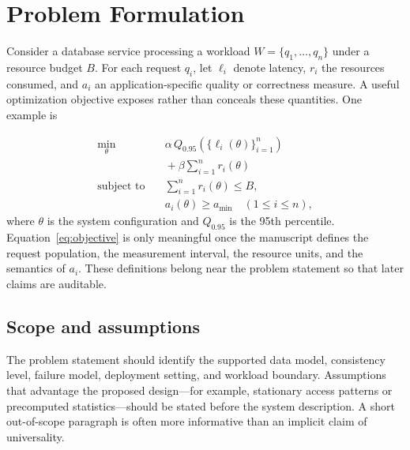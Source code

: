 \section{Problem Formulation}

Consider a database service processing a workload
$W=\{q_1,\ldots,q_n\}$ under a resource budget $B$.  For each request $q_i$,
let $\ell_i$ denote latency, $r_i$ the resources consumed, and $a_i$ an
application-specific quality or correctness measure.  A useful optimization
objective exposes rather than conceals these quantities.  One example is

\begin{equation}
  \begin{aligned}
    \min_{\theta}\quad
      & \alpha\,Q_{0.95}\!\left(\{\ell_i(\theta)\}_{i=1}^{n}\right) \\
      & {}+ \beta\sum_{i=1}^{n} r_i(\theta) \\
    \text{subject to}\quad
      & \sum_{i=1}^{n} r_i(\theta) \le B, \\
      & a_i(\theta) \ge a_{\min}\quad (1\le i\le n),
  \end{aligned}
  \label{eq:objective}
\end{equation}
where $\theta$ is the system configuration and $Q_{0.95}$ is the 95th
percentile.  Equation~\ref{eq:objective} is only meaningful once the manuscript
defines the request population, the measurement interval, the resource units,
and the semantics of $a_i$.  These definitions belong near the problem
statement so that later claims are auditable.

\subsection{Scope and assumptions}

The problem statement should identify the supported data model, consistency
level, failure model, deployment setting, and workload boundary.  Assumptions
that advantage the proposed design---for example, stationary access patterns or
precomputed statistics---should be stated before the system description.  A
short out-of-scope paragraph is often more informative than an implicit claim
of universality.
